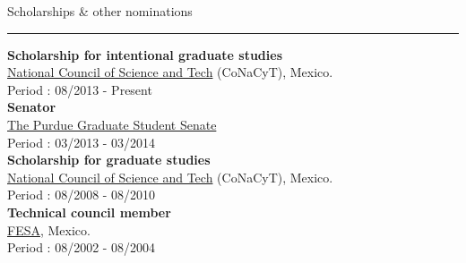 \documentclass[letterpaper,10pt]{article}
\begin{document}
\begin{minipage}{0.4\textwidth} 
\vspace*{1.5cm}
{\centering \large{Scholarships \& other nominations}} \\
\textcolor{Dandelion}{\rule{0.95\textwidth}{0.05in}}

\textbf{Scholarship for intentional graduate studies} \\
\href{http://www.conacyt.gob.mx}{National Council of Science and Tech} (CoNaCyT),
Mexico. \\
Period : 08/2013 - Present \\

\textbf{Senator} \\
\href{http://web.ics.purdue.edu/~pgsg/}{The Purdue Graduate Student Senate} \\
Period : 03/2013 - 03/2014 \\

\textbf{Scholarship for graduate studies} \\
\href{http://www.conacyt.gob.mx}{National Council of Science and Tech} (CoNaCyT),
Mexico. \\
Period : 08/2008 - 08/2010 \\

\textbf{Technical council member} \\
\href{http://consejotecnico.acatlan.unam.mx/}{FESA},
Mexico. \\
Period : 08/2002 - 08/2004
\end{minipage} 



\end{document}
